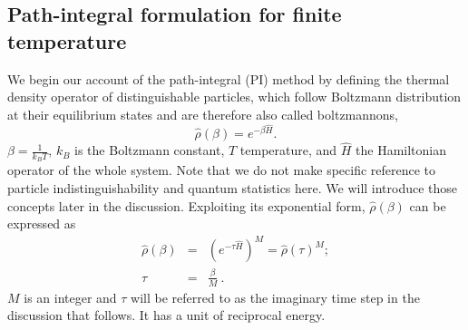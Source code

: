\documentclass[12pt]{iopart}
\begin{document}
\subsection{Path-integral formulation for finite temperature} \label{subsec:pi}
We begin our account of the path-integral (PI) method by defining the thermal density operator of distinguishable particles,
which follow Boltzmann distribution at their equilibrium states and are therefore also called boltzmannons,
\begin{equation}
\hat{\rho}\left( \beta \right)=e^{-\beta \hat{H}}.
\end{equation}
$\beta=\frac{1}{k_BT}$, $k_B$ is the Boltzmann constant, $T$ temperature, and $\hat{H}$ 
the Hamiltonian operator of the whole system. 
Note that we do not make specific reference to particle indistinguishability and quantum statistics here.
We will introduce those concepts later in the discussion.
Exploiting its exponential form, $\hat{\rho}\left(\beta\right)$ can be expressed as
\begin{eqnarray}
\hat{\rho}\left(\beta\right)&=&\left( e^{-\tau\hat{H}} \right)^M=\hat{\rho}\left(\tau \right)^M; \nonumber\\
\tau&=&\frac{\beta}{M}~.
\end{eqnarray}
$M$ is an integer and $\tau$ will be referred to as the imaginary time step in the discussion that follows. It has a unit of reciprocal energy.
\end{document}
